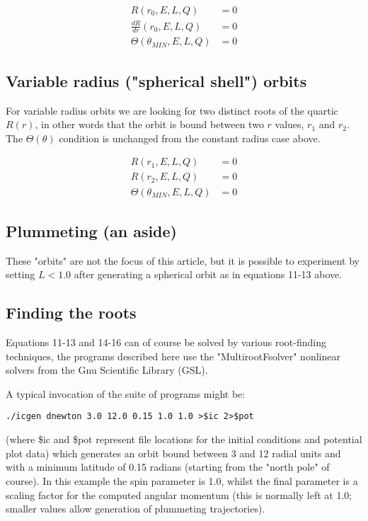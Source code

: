 \documentclass[11pt]{article}
\begin{document}
\begin{align}
R(r_0, E, L, Q) &= 0 \\
\frac{d R}{d r} (r_0, E, L, Q) &= 0 \\
\Theta(\theta_{MIN}, E, L, Q) &= 0
\end{align}

\subsection{Variable radius ("spherical shell") orbits}

For variable radius orbits we are looking for two distinct roots of the quartic $R(r)$, in other words that the orbit is bound between two $r$ values, $r_1$ and $r_2$.
The $\Theta (\theta)$ condition is unchanged from the constant radius case above.

\begin{align}
R(r_1, E, L, Q) &= 0 \\
R(r_2, E, L, Q) &= 0 \\
\Theta(\theta_{MIN}, E, L, Q) &= 0
\end{align}

\subsection{Plummeting (an aside)}

These "orbits" are not the focus of this article, but it is possible to experiment by setting $L < 1.0$ after generating a spherical orbit as in equations 11-13 above.

\subsection{Finding the roots}

Equations 11-13 and 14-16 can of course be solved by various root-finding techniques, the programs described here use the "MultirootFsolver" nonlinear solvers from the Gnu Scientific Library (GSL).

A typical invocation of the suite of programs might be:
\begin{verbatim}
./icgen dnewton 3.0 12.0 0.15 1.0 1.0 >$ic 2>$pot
\end{verbatim}
(where \$ic and \$pot represent file locations for the initial conditions and potential plot data) which generates an orbit bound between 3 and 12 radial units and with a minimum latitude of 0.15 radians (starting from the "north pole" of course).  In this example the spin parameter is 1.0, whilst the final parameter is a scaling factor for the computed angular momentum (this is normally left at 1.0; smaller values allow generation of plummeting trajectories).
\end{document}
